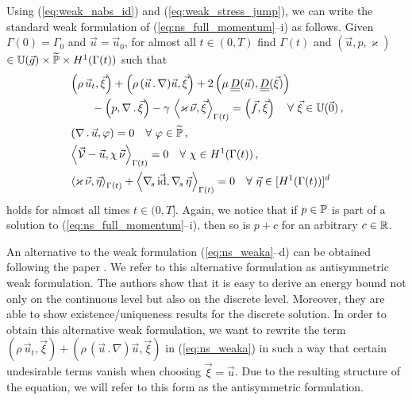 Using (\ref{eq:weak_nabs_id}) and (\ref{eq:weak_stress_jump}), we can write the
standard weak formulation of (\ref{eq:ns_full_momentum}--i) as follows. Given
$\Gamma(0) = \Gamma_0$ and $\vec u = \vec u_0$, for almost all $t\in(0,T)$ find
$\Gamma(t)$ and ${(\vec u, p, \varkappa)}$ ${\in \mathbb{U}(\vec{g}) \times \widetilde{\mathbb{P}}
\times H^1(\Gamma(t))}$ such that
\begin{subequations}
\begin{align}
& \left(\rho\,\vec u_t, \vec \xi\right) + \left(\rho\,(\vec u \,.\, \nabla) \vec
u,\vec \xi\right) + 2\left(\mu\,\mat D(\vec u), \mat D(\vec \xi)\right)
\nonumber \\
& \qquad - \left(p, \nabla\,.\,\vec \xi\right)
- \gamma\,\left\langle \varkappa\,\vec\nu, \vec\xi\right\rangle_{\Gamma(t)}
= \left(\vec f, \vec \xi\right)\quad \forall\ \vec\xi \in \uspace 0 \,,
\label{eq:ns_weaka}\\
& \left(\nabla\,.\,\vec u, \varphi\right) = 0
\quad \forall\ \varphi \in \pnormspace\,, \label{eq:ns_weakb} \\
&  \left\langle \V
- \vec u, \chi\,\vec\nu \right\rangle_{\Gamma(t)} = 0
\quad \forall\ \chi \in H^1(\Gamma(t))\,, \label{eq:ns_weakc} \\
& \left\langle \varkappa\,\vec\nu, \vec\eta \right\rangle_{\Gamma(t)}
+ \left\langle \nabs\,\vec \id, \nabs\,\vec \eta \right\rangle_{\Gamma(t)}
= 0  \quad \forall\ \vec\eta \in [H^1(\Gamma(t))]^d\,\label{eq:ns_weakd}
\end{align}
\end{subequations}
holds for almost all times $t \in (0,T]$. Again, we notice that if
$p \in \mathbb{P}$ is part of a solution to (\ref{eq:ns_full_momentum}--i), then
so is $p + c$ for an arbitrary $c\in \mathbb R$.

An alternative to the weak formulation (\ref{eq:ns_weaka}--d) can be obtained
following the paper \cite{fluidfbp}. We refer to this alternative formulation
as antisymmetric weak formulation. The authors show that it is easy to derive
an energy bound not only on the continuous level but also on the discrete
level. Moreover, they are able to show existence/uniqueness results for the
discrete solution. In order to obtain this
alternative weak formulation, we want to rewrite the term $\left(\rho\,\vec u_t,
\vec \xi\right) + \left(\rho\,(\vec u \,.\, \nabla) \vec u,\vec \xi\right)$ in
(\ref{eq:ns_weaka}) in such a way that certain undesirable terms vanish when
choosing $\vec \xi = \vec u$. Due to the resulting structure of the equation,
we will refer to this form as the antisymmetric formulation.

